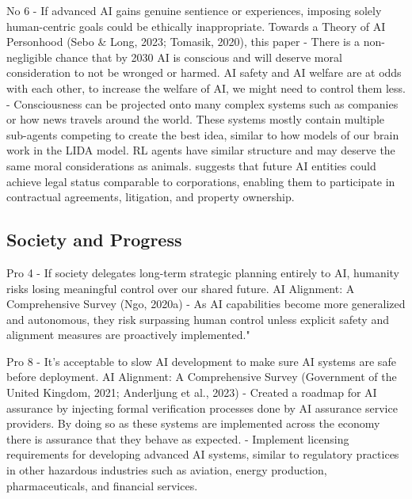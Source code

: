 No 6 - If advanced AI gains genuine sentience or experiences, imposing solely human-centric goals could be ethically inappropriate.
Towards a Theory of AI Personhood
(Sebo \& Long, 2023; Tomasik, 2020), this paper
\citep{sebo_moral_2025} - There is a non-negligible chance that by 2030 AI is conscious and will deserve moral consideration to not be wronged or harmed. AI safety and AI welfare are at odds with each other, to increase the welfare of AI, we might need to control them less.
\citep{tomasik_dialogue_2015} - Consciousness can be projected onto many complex systems such as companies or how news travels around the world. These systems mostly contain multiple sub-agents competing to create the best idea, similar to how models of our brain work in the LIDA model. RL agents have similar structure and may deserve the same moral considerations as animals.
\cite{ward_towards_2025} suggests that future AI entities could achieve legal status comparable to corporations, enabling them to participate in contractual agreements, litigation, and property ownership.

\subsection{Society and Progress}

Pro 4 - If society delegates long-term strategic planning entirely to AI, humanity risks losing meaningful control over our shared future.
AI Alignment: A Comprehensive Survey
(Ngo, 2020a)
\citep{ngo_agi_2020} - As AI capabilities become more generalized and autonomous, they risk surpassing human control unless explicit safety and alignment measures are proactively implemented."

Pro 8 - It's acceptable to slow AI development to make sure AI systems are safe before deployment.
AI Alignment: A Comprehensive Survey
(Government of the United Kingdom, 2021; Anderljung et al., 2023)
\citep{government_of_the_united_kingdom_roadmap_2021} - Created a roadmap for AI assurance by injecting formal verification processes done by AI assurance service providers. By doing so as these systems are implemented across the economy there is assurance that they behave as expected.
\citep{anderljung_frontier_2023} - Implement licensing requirements for developing advanced AI systems, similar to regulatory practices in other hazardous industries such as aviation, energy production, pharmaceuticals, and financial services.

